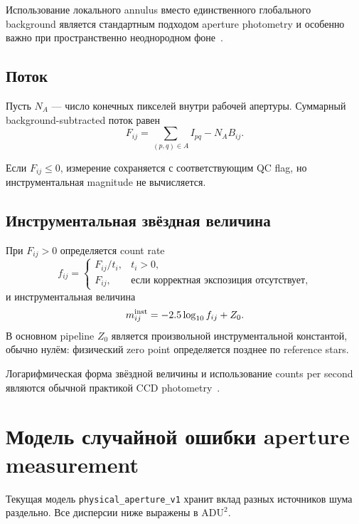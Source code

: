 Использование локального annulus вместо единственного глобального background является стандартным подходом aperture photometry и особенно важно при пространственно неоднородном фоне~\cite{howell1989,photutils_aperture}.

\subsection{Поток}

Пусть $N_A$ --- число конечных пикселей внутри рабочей апертуры. Суммарный background-subtracted поток равен
\begin{equation}
  F_{ij}
  = \sum_{(p,q)\in A}I_{pq}-N_A B_{ij}.
  \label{eq:aperture-flux}
\end{equation}

Если $F_{ij}\le0$, измерение сохраняется с соответствующим QC flag, но инструментальная magnitude не вычисляется.

\subsection{Инструментальная звёздная величина}

При $F_{ij}>0$ определяется count rate
\begin{equation}
  f_{ij}=\begin{cases}
  F_{ij}/t_i, & t_i>0,\\
  F_{ij}, & \text{если корректная экспозиция отсутствует},
  \end{cases}
\end{equation}
и инструментальная величина
\begin{equation}
  m^{\rm inst}_{ij}
  =-2.5\log_{10}f_{ij}+Z_0.
  \label{eq:instrumental-mag}
\end{equation}
В основном pipeline $Z_0$ является произвольной инструментальной константой, обычно нулём: физический zero point определяется позднее по reference stars.

Логарифмическая форма звёздной величины и использование counts per second являются обычной практикой CCD photometry~\cite{howell1989}.

\section{Модель случайной ошибки aperture measurement}
\label{sec:random-error-model}

Текущая модель \texttt{physical\_aperture\_v1} хранит вклад разных источников шума раздельно. Все дисперсии ниже выражены в $\mathrm{ADU}^2$.

